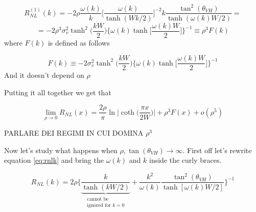 \[
    R_{NL}^{(1)}(k)=-2\rho\frac{\omega(k)}k\bigg[\frac{\omega(k)}{\tanh(Wk/2)} \bigg]^{-2}k\frac{\tan^2(\theta_{VH})}{\tanh(\omega(k)W/2)}=
\]
\[
    =-2\rho^3\sigma_v^2 \tanh^2\bigg(\frac{kW}2\bigg)\bigg\{\omega(k)\tanh\bigg[\frac{\omega(k) W}2\bigg]\bigg\}^{-1}\equiv
    \rho^3F(k)
\]
where $F(k)$ is defined as follows

\begin{equation}
    F(k)\equiv -2\sigma_v^2\tanh^2\bigg(\frac{kW}2\bigg)\bigg\{\omega(k)\tanh\bigg[\frac{\omega(k) W}2\bigg]\bigg\}^{-1}
\end{equation}
And it doesn't depend on $\rho$

Putting it all together we get that

\begin{equation}
    \lim_{\rho\to 0} R_{NL}(x)= \frac{2\rho}\pi\ln\bigg |\coth \Big(\frac{\pi x}{2W}\Big)\bigg | + \rho^3F(x) + o(\rho^5)
\end{equation}

PARLARE DEI REGIMI IN CUI DOMINA $\rho^3$

Now let's study what happens when $\rho,\tan(\theta_{VH})\to \infty$. First off let's rewrite equation \ref{eq:rnlk} and bring the $\omega(k)$ and $k$ inside the curly braces.

\[
    R_{NL}(k)=2\rho
    \bigg\{
        \underbrace{\frac{k}{\tanh(kW/2)}}_{\substack{\text{cannot be}\\\text{ignored for } k=0}} + \frac {k^2}{\omega(k)}\frac{\tan^2(\theta_{VH})}{\tanh[\omega(k)W/2]}    
    \bigg\}^{-1}
\]

